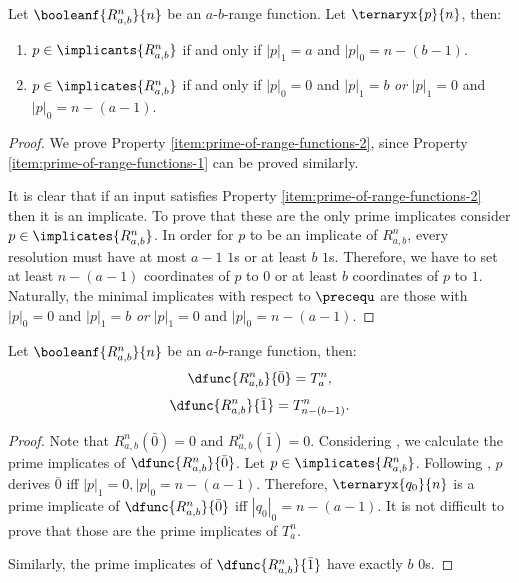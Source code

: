 \documentclass[acmsmall, nonacm, authorversion]{acmart}
\begin{document}
\begin{lemma}\label{lem:prime-of-range-functions}
Let $\booleanf{R_{a,b}^n}{n}$ be an $a$-$b$-range function. Let $\ternaryx{p}{n}$, then:
\begin{enumerate}
    \item $p\in \implicants{R_{a,b}^n}$ if and only if $|p|_1=a$ and $|p|_0=n-(b-1)$. \label{item:prime-of-range-functions-1}
    \item $p\in \implicates{R_{a,b}^n}$ if and only if $|p|_0=0$ and $|p|_1=b$ \emph{or} $|p|_1=0$ and $|p|_0=n-(a-1)$. \label{item:prime-of-range-functions-2}
\end{enumerate}
\end{lemma}
\begin{proof}
We prove Property \ref{item:prime-of-range-functions-2}, since Property \ref{item:prime-of-range-functions-1} can be proved similarly.

It is clear that if an input satisfies Property \ref{item:prime-of-range-functions-2} then it is an implicate. To prove that these are the only prime implicates consider $p\in \implicates{R_{a,b}^n}$. In order for $p$ to be an implicate of $R_{a,b}^n$, every resolution must have at most $a-1$ $1$s or at least $b$ $1$s. Therefore, we have to set at least $n-(a-1)$ coordinates of $p$ to $0$ or at least $b$ coordinates of $p$ to $1$. Naturally, the minimal implicates with respect to $\precequ$ are those with $|p|_0=0$ and $|p|_1=b$ \emph{or} $|p|_1=0$ and $|p|_0=n-(a-1)$. 
\end{proof}

\begin{lemma}\label{lem:derivatives-of-range-functions}
Let $\booleanf{R_{a,b}^n}{n}$ be an $a$-$b$-range function, then:
\[
\dfunc{R_{a,b}^n}{\bar{0}}=T_{a}^n,
\]
\[
\dfunc{R_{a,b}^n}{\bar{1}}=T_{n-(b-1)}^n.
\]
\end{lemma}
\begin{proof}
Note that $R_{a,b}^n(\bar{0})=0$ and $R_{a,b}^n(\bar{1})=0$. Considering , we calculate the prime implicates of $\dfunc{R_{a,b}^n}{\bar{0}}$.
Let $p\in \implicates{R_{a,b}^n}$. Following , $p$ derives $\bar{0}$ iff $|p|_1=0, |p|_0=n-(a-1)$. Therefore, $\ternaryx{q_0}{n}$ is a prime implicate of $\dfunc{R_{a,b}^n}{\bar{0}}$ iff $|q_0|_0=n-(a-1)$. It is not difficult to prove that those are the prime implicates of $T_a^n$. 

Similarly, the prime implicates of $\dfunc{R_{a,b}^n}{\bar{1}}$ have exactly $b$ $0$s. 
\end{proof}
\end{document}
